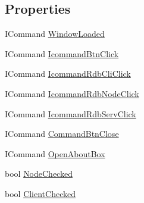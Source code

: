 \subsection*{Properties}
\begin{DoxyCompactItemize}
\item 
I\+Command \hyperlink{class_a_d_net_1_1_g_u_i_1_1_view_model_1_1_vmad_net_launcher_aa055b33780bff525f5eb22f771df0a1f}{Window\+Loaded}
\item 
I\+Command \hyperlink{class_a_d_net_1_1_g_u_i_1_1_view_model_1_1_vmad_net_launcher_aed4f46abec14c7e53e15d3cfbe133a26}{Icommand\+Btn\+Click}
\item 
I\+Command \hyperlink{class_a_d_net_1_1_g_u_i_1_1_view_model_1_1_vmad_net_launcher_ae125767189d12a9891a80cd802595d4a}{Icommand\+Rdb\+Cli\+Click}
\item 
I\+Command \hyperlink{class_a_d_net_1_1_g_u_i_1_1_view_model_1_1_vmad_net_launcher_aa7e61ac341e8db1969119547f5c7c6bc}{Icommand\+Rdb\+Node\+Click}
\item 
I\+Command \hyperlink{class_a_d_net_1_1_g_u_i_1_1_view_model_1_1_vmad_net_launcher_ac8629aa358ed74eb585d5996080e8071}{Icommand\+Rdb\+Serv\+Click}
\item 
I\+Command \hyperlink{class_a_d_net_1_1_g_u_i_1_1_view_model_1_1_vmad_net_launcher_a1247f8ac26d2762df5974a2c875e58af}{Command\+Btn\+Close}
\item 
I\+Command \hyperlink{class_a_d_net_1_1_g_u_i_1_1_view_model_1_1_vmad_net_launcher_aedee25ba205851a8bb0796392b8e7fae}{Open\+About\+Box}
\item 
bool \hyperlink{class_a_d_net_1_1_g_u_i_1_1_view_model_1_1_vmad_net_launcher_ad806680676c574bbdff3ddc1d3082253}{Node\+Checked}
\item 
bool \hyperlink{class_a_d_net_1_1_g_u_i_1_1_view_model_1_1_vmad_net_launcher_ac09de69ecf9db84fe7427e2fe1c9b9d3}{Client\+Checked}

\end{DoxyCompactItemize}
